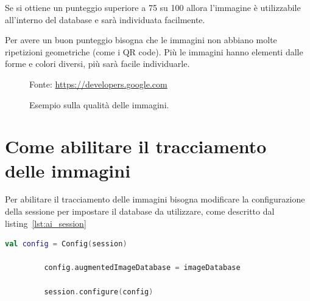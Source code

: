\documentclass[crop=false, class=book]{standalone}
\begin{document}
	Se si ottiene un punteggio superiore a 75 su 100 allora l'immagine è utilizzabile all'interno del database e sarà individuata facilmente.
	
	Per avere un buon punteggio bisogna che le immagini non abbiano molte ripetizioni geometriche (come i QR code). Più le immagini hanno elementi dalle forme e colori diversi, più sarà facile individuarle.
	
	
	
	\begin{center}
		\begin{figure}[htp]
			\centering
			{Fonte: \url{https://developers.google.com}}
			\caption{Esempio sulla qualità delle immagini.}
			\label{fig:env_und}
		\end{figure}
	\end{center}
	
	\section{Come abilitare il tracciamento delle immagini}
	Per abilitare il tracciamento delle immagini bisogna modificare la configurazione della sessione per impostare il database da utilizzare, come descritto dal listing~\vref{lst:ai_session}
	
	\begin{center}
		\begin{minipage}{0.95\textwidth}
		\begin{lstlisting}[caption={Descrizione del listing.}, label={lst:ai_session}, language=Kotlin]
		 val config = Config(session)
		
		 config.augmentedImageDatabase = imageDatabase
		
		 session.configure(config)
		\end{lstlisting}
		\end{minipage}
	\end{center}
\end{document}
